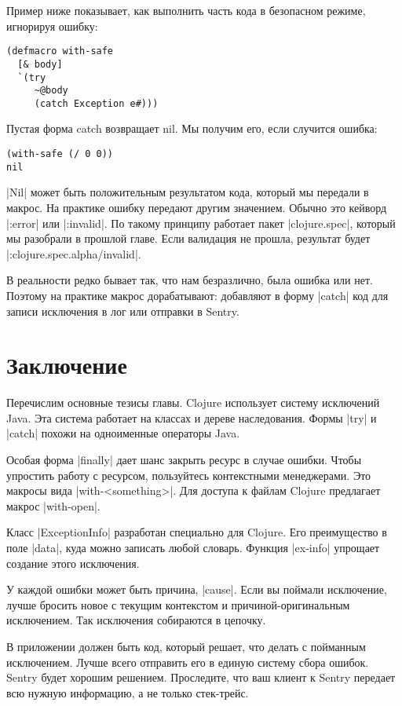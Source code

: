 Пример ниже показывает, как выполнить часть кода в безопасном режиме, игнорируя
ошибку:

\begin{verbatim}
(defmacro with-safe
  [& body]
  `(try
     ~@body
     (catch Exception e#)))
\end{verbatim}

Пустая форма catch возвращает nil. Мы получим его, если случится ошибка:

\begin{verbatim}
(with-safe (/ 0 0))
nil
\end{verbatim}

\spverb|Nil| может быть положительным результатом кода, который мы передали в
макрос. На практике ошибку передают другим значением. Обычно это кейворд
\spverb|:error| или \spverb|:invalid|. По такому принципу работает пакет \spverb|clojure.spec|,
который мы разобрали в прошлой главе. Если валидация не прошла, результат будет
\spverb|:clojure.spec.alpha/invalid|.

В реальности редко бывает так, что нам безразлично, была ошибка или нет. Поэтому
на практике макрос дорабатывают: добавляют в форму \spverb|catch| код для записи
исключения в лог или отправки в Sentry.

\section{Заключение}

Перечислим основные тезисы главы. Clojure использует систему исключений
Java. Эта система работает на классах и дереве наследования. Формы \spverb|try| и
\spverb|catch| похожи на одноименные операторы Java.

Особая форма \spverb|finally| дает шанс закрыть ресурс в случае ошибки. Чтобы упростить
работу с ресурсом, пользуйтесь контекстными менеджерами. Это макросы вида
\spverb|with-<something>|. Для доступа к файлам Clojure предлагает макрос \spverb|with-open|.

Класс \spverb|ExceptionInfo| разработан специально для Clojure. Его преимущество в поле
\spverb|data|, куда можно записать любой словарь. Функция \spverb|ex-info| упрощает создание
этого исключения.

У каждой ошибки может быть причина, \spverb|cause|. Если вы поймали исключение, лучше
бросить новое с текущим контекстом и причиной-оригинальным исключением. Так
исключения собираются в цепочку.

В приложении должен быть код, который решает, что делать с пойманным
исключением. Лучше всего отправить его в единую систему сбора ошибок. Sentry
будет хорошим решением. Проследите, что ваш клиент к Sentry передает всю нужную
информацию, а не только стек-трейс.

